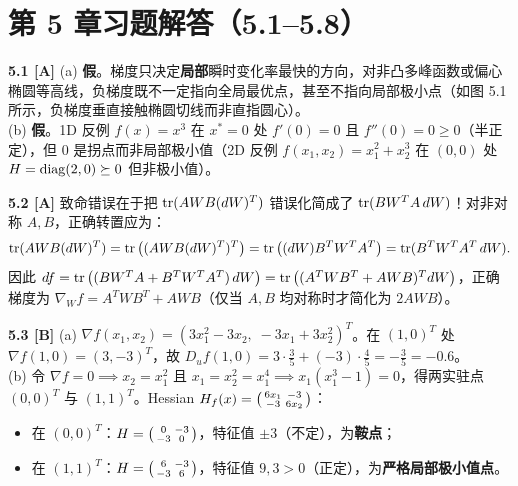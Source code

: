 \section{第 5 章习题解答（5.1--5.8）}

\textbf{5.1 [A]}
(a) \textbf{假}。梯度只决定\textbf{局部}瞬时变化率最快的方向，对非凸多峰函数或偏心椭圆等高线，负梯度既不一定指向全局最优点，甚至不指向局部极小点（如图 5.1 所示，负梯度垂直接触椭圆切线而非直指圆心）。\\
(b) \textbf{假}。1D 反例 $f(x) = x^3$ 在 $x^*=0$ 处 $f'(0)=0$ 且 $f''(0)=0 \ge 0$（半正定），但 $0$ 是拐点而非局部极小值（2D 反例 $f(x_1,x_2)=x_1^2 + x_2^3$ 在 $(0,0)$ 处 $H=\operatorname{diag}(2,0)\succeq 0$ 但非极小值）。

\textbf{5.2 [A]}
致命错误在于把 $\operatorname{tr}(AWB(dW)^T)$ 错误化简成了 $\operatorname{tr}(BW^TA\,dW)$！对非对称 $A,B$，正确转置应为：
\[
  \operatorname{tr}(AWB(dW)^T) = \operatorname{tr}\big((AWB(dW)^T)^T\big) = \operatorname{tr}\big((dW) B^T W^T A^T\big) = \operatorname{tr}(B^T W^T A^T\,dW).
\]
因此 $df = \operatorname{tr}\big((BW^TA + B^TW^TA^T)\,dW\big) = \operatorname{tr}\big((A^TWB^T + AWB)^T dW\big)$，正确梯度为 $\nabla_W f = A^T W B^T + A W B$（仅当 $A,B$ 均对称时才简化为 $2AWB$）。

\textbf{5.3 [B]}
(a) $\nabla f(x_1, x_2) = (3x_1^2 - 3x_2,\; -3x_1 + 3x_2^2)^T$。在 $(1,0)^T$ 处 $\nabla f(1,0) = (3, -3)^T$，故 $D_u f(1,0) = 3\cdot\frac{3}{5} + (-3)\cdot\frac{4}{5} = -\frac{3}{5} = -0.6$。\\
(b) 令 $\nabla f = 0 \implies x_2 = x_1^2$ 且 $x_1 = x_2^2 = x_1^4 \implies x_1(x_1^3-1)=0$，得两实驻点 $(0,0)^T$ 与 $(1,1)^T$。Hessian $H_f(x) = \begin{psmallmatrix}6x_1 & -3\\ -3 & 6x_2\end{psmallmatrix}$：
\begin{itemize}
  \item 在 $(0,0)^T$：$H = \begin{psmallmatrix}0&-3\\-3&0\end{psmallmatrix}$，特征值 $\pm 3$（不定），为\textbf{鞍点}；
  \item 在 $(1,1)^T$：$H = \begin{psmallmatrix}6&-3\\-3&6\end{psmallmatrix}$，特征值 $9, 3 > 0$（正定），为\textbf{严格局部极小值点}。
\end{itemize}

